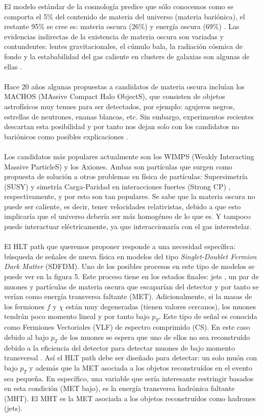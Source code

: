 El modelo estándar de la cosmología predice que sólo conocemos como se comporta el 5\% del contenido de materia del universo (materia bariónica), el restante 95\% se cree es: materia oscura (26\%) y energía oscura (69\%) \cite{Ade:2015xua}. Las evidencias indirectas de la existencia de materia oscura son variadas y contundentes: lentes gravitacionales, el cúmulo bala, la radiación cósmica de fondo y la estababilidad del gas caliente en clusters de galaxias son algunas de ellas \cite{Freese:2017idy}. 
\\
\\
Hace 20 años algunas propuestas a candidatos de materia oscura incluían los MACHOS (MAssive Compact Halo ObjectS), que consisten de objetos astrofísicos muy tenues para ser detectados, por ejemplo: agujeros negros, estrellas de neutrones, enanas blancas, etc. Sin embargo, experimentos recientes descartan esta posibilidad y por tanto nos dejan solo con los candidatos no bariónicos como posibles explicaciones \cite{Freese:1999ge,Fields:1999ar}.
\\
\\
Los candidatos más populares actualmente son los WIMPS (Weakly Interacting Massive ParticleS) y los Axiones. Ambas son partículas que surgen como propuesta de solución a otros problemas en física de partículas: Supersimetría (SUSY) \cite{SUSY} y simetría Carga-Paridad en interacciones fuertes (Strong CP) \cite{StrongCP}, respectivamente, y por esto son tan populares. Se sabe que la materia oscura no puede ser caliente, es decir, tener velocidades relativistas, debido a que esto implicaría que el universo debería ser más homogéneo de lo que es. Y tampoco puede interactuar eléctricamente, ya que interaccionaría con el gas interestelar. 
\\
\\
El HLT path que queremos proponer responde a una necesidad específica: búsqueda de señales de nueva física en modelos del tipo \textit{Singlet-Doublet Fermion Dark Matter} (SDFDM)\cite{1475-7516-2016-03-048}. Uno de los posibles procesos en este tipo de modelos se puede ver en la figura 5. Este proceso tiene en los estados finales: jets , un par de muones y partículas de materia oscura que escaparían del detector y por tanto se verían como energía transversa faltante (MET). Adicionalmente, si la masas de los fermiones $f$ y $\chi$ están muy degeneradas (tienen valores cercanos), los muones tendrán poco momento lineal y por tanto bajo $p_T$. Este tipo de señal es conocida como Fermiones Vectoriales (VLF) de espectro comprimido (CS). En este caso debido al bajo $p_T$ de los muones se espera que uno de ellos no sea reconstruído debido a la eficiencia del detector para detectar muones de bajo momento transversal \cite{Chatrchyan:2012xi}. Así el HLT path debe ser diseñado para detectar: un solo muón con bajo $p_T$ y además que la MET asociada a los objetos reconstruídos en el evento sea pequeña. En específico, una variable que sería interesante restringir basados en esta condición (MET bajo), es la energía transversa hadrónica faltante (MHT). El MHT es la MET asociada a los objetos reconstruídos como hadrones (jets).
